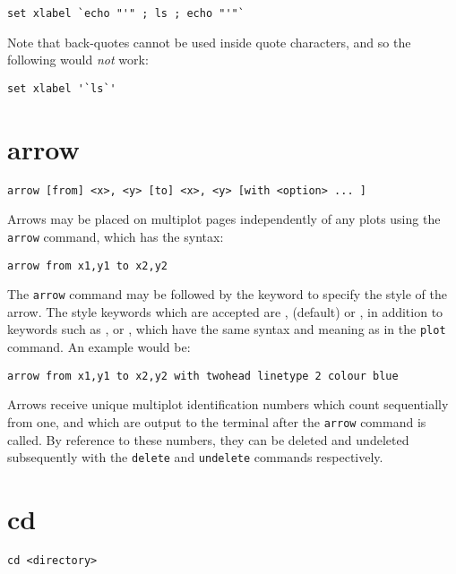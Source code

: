 \begin{verbatim}
set xlabel `echo "'" ; ls ; echo "'"`
\end{verbatim}

\noindent Note that back-quotes cannot be used inside quote characters, and so
the following would \textit{not} work:

\begin{verbatim}
set xlabel '`ls`'
\end{verbatim}

\section{arrow}

\begin{verbatim}
arrow [from] <x>, <y> [to] <x>, <y> [with <option> ... ]
\end{verbatim}

Arrows may be placed on multiplot pages independently of any plots using the
{\tt arrow} command, which has the syntax:

\begin{verbatim}
arrow from x1,y1 to x2,y2
\end{verbatim}

The {\tt arrow} command may be followed by the  keyword to
specify the style of the arrow. The style keywords which are accepted are
,  (default) or , in addition to
keywords such as ,  or ,
which have the same syntax and meaning as in the {\tt plot} command. An example
would be:

\begin{verbatim}
arrow from x1,y1 to x2,y2 with twohead linetype 2 colour blue
\end{verbatim}

Arrows receive unique multiplot identification numbers which count sequentially
from one, and which are output to the terminal after the {\tt arrow} command is
called. By reference to these numbers, they can be deleted and undeleted
subsequently with the {\tt delete} and {\tt undelete} commands respectively.

\section{cd}

\begin{verbatim}
cd <directory>
\end{verbatim}

